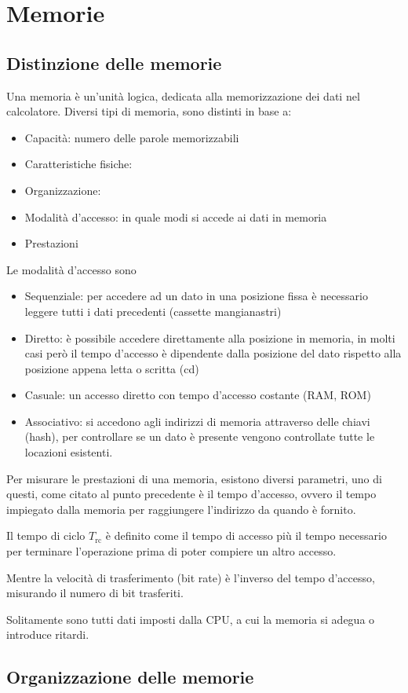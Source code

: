 \documentclass[../template]{subfiles}
\begin{document}
\section{Memorie}
\subsection{Distinzione delle memorie}
Una memoria è un'unità logica, dedicata alla memorizzazione dei dati nel calcolatore.
Diversi tipi di memoria, sono distinti in base a:
\begin{itemize}
    \item Capacità: numero delle parole memorizzabili
    \item Caratteristiche fisiche:
    \item Organizzazione:
    \item Modalità d'accesso: in quale modi si accede ai dati in memoria
    \item Prestazioni
\end{itemize}
Le modalità d'accesso sono
\begin{itemize}
    \item Sequenziale: per accedere ad un dato in una posizione fissa è necessario leggere tutti i dati precedenti (cassette mangianastri)
    \item Diretto: è possibile accedere direttamente alla posizione in memoria, in molti casi però il tempo d'accesso è dipendente dalla posizione del dato rispetto alla posizione appena letta o scritta (cd)
    \item Casuale: un accesso diretto con tempo d'accesso costante (RAM, ROM)
    \item Associativo: si accedono agli indirizzi di memoria attraverso delle chiavi (hash), per controllare se un dato è presente vengono controllate tutte le locazioni esistenti.
\end{itemize}

Per misurare le prestazioni di una memoria, esistono diversi parametri, uno di questi, come citato al punto precedente è il tempo d'accesso,  ovvero il tempo impiegato dalla memoria per raggiungere l'indirizzo da quando è fornito.

Il tempo di ciclo $T_\text{rc}$ è definito come il tempo di accesso più il tempo necessario per terminare l'operazione prima di poter compiere un altro accesso.

Mentre la velocità di trasferimento (bit rate) è l'inverso del tempo d'accesso, misurando il numero di bit trasferiti.

Solitamente sono tutti dati imposti dalla CPU, a cui la memoria si adegua o introduce ritardi.
\subsection{Organizzazione delle memorie}
\end{document}

